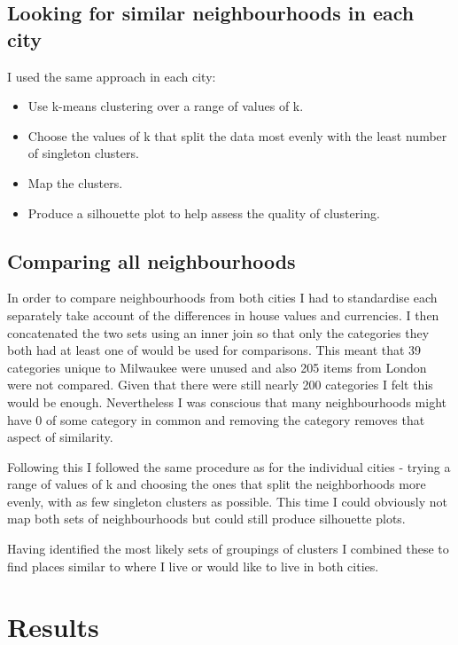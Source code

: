 \documentclass[a4paper,12pt,final,UKenglish]{article}
\begin{document}
        \subsection{Looking for similar neighbourhoods in each city}
        I used the same approach in each city:
        \begin{itemize}
            \item Use k-means clustering over a range of values of k.
            \item Choose the values of k that split the data most evenly with the least number of singleton clusters.
            \item Map the clusters.
            \item Produce a silhouette plot to help assess the quality of clustering.
        \end{itemize}
        
        \subsection{Comparing all neighbourhoods}
        In order to compare neighbourhoods from both cities I had to standardise each separately take account of the differences in house values and currencies.
        I then concatenated the two sets using an inner join so that only the categories they both had at least one of would be used for comparisons.
        This meant that 39 categories unique to Milwaukee were unused and also 205 items from London were not compared.
        Given that there were still nearly 200 categories I felt this would be enough.
        Nevertheless I was conscious that many neighbourhoods might have 0 of some category in common and removing the category removes that aspect of similarity.
        
        Following this I followed the same procedure as for the individual cities - trying a range of values of k and choosing the ones that split the
        neighborhoods more evenly, with as few singleton clusters as possible.  This time I could obviously not map both sets of neighbourhoods but could
        still produce silhouette plots.
        
        Having identified the most likely sets of groupings of clusters I combined these to find places similar to where I live or would like to live in both cities.
    
    \section{Results}
\end{document}
